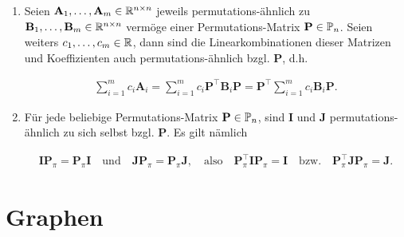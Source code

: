 \begin{remark}
\begin{enumerate}[
                    label = \arabic*.,
                    wide,
                    labelindent = 0pt
                ]
                    \item Seien $\mathbf A_1, \dots, \mathbf A_m \in \R^{n \times n}$ jeweils permutations-ähnlich zu $\mathbf B_1, \dots, \mathbf B_m \in \R^{n \times n}$ vermöge einer Permutations-Matrix $\mathbf P \in \P_n$.
                    Seien weiters $c_1, \dots, c_m \in \R$, dann sind die Linearkombinationen dieser Matrizen und Koeffizienten auch permutations-ähnlich bzgl. $\mathbf P$, d.h.

                    \begin{align*}
                        \sum_{i=1}^m c_i \mathbf A_i
                        =
                        \sum_{i=1}^m c_i \mathbf P^\top \mathbf B_i \mathbf P
                        =
                        \mathbf P^\top \sum_{i=1}^m c_i \mathbf B_i \mathbf P.
                    \end{align*}

                    \item Für jede beliebige Permutations-Matrix $\mathbf P \in \P_n$, sind $\mathbf I$ und $\mathbf J$ permutations-ähnlich zu sich selbst bzgl. $\mathbf P$.
                    Es gilt nämlich

                    \begin{align*}
                        \mathbf I \mathbf P_\pi = \mathbf P_\pi \mathbf I
                        \quad
                        \text{und}
                        \quad
                        \mathbf J \mathbf P_\pi = \mathbf P_\pi \mathbf J,
                        \quad
                        \text{also}
                        \quad
                        \mathbf P_\pi^\top \mathbf I \mathbf P_\pi = \mathbf I
                        \quad
                        \text{bzw.}
                        \quad
                        \mathbf P_\pi^\top \mathbf J \mathbf P_\pi = \mathbf J.
                    \end{align*}

                \end{enumerate}

            \end{remark}

    \section{Graphen}

